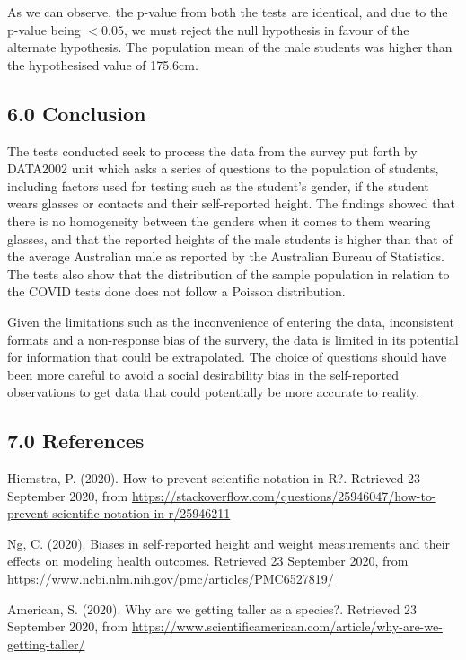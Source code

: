\documentclass[
]{article}
\begin{document}
As we can observe, the p-value from both the tests are identical, and
due to the p-value being \(<0.05\), we must reject the null hypothesis
in favour of the alternate hypothesis. The population mean of the male
students was higher than the hypothesised value of 175.6cm.

\hypertarget{conclusion}{%
\subsection{6.0 Conclusion}\label{conclusion}}

The tests conducted seek to process the data from the survey put forth
by DATA2002 unit which asks a series of questions to the population of
students, including factors used for testing such as the student's
gender, if the student wears glasses or contacts and their self-reported
height. The findings showed that there is no homogeneity between the
genders when it comes to them wearing glasses, and that the reported
heights of the male students is higher than that of the average
Australian male as reported by the Australian Bureau of Statistics. The
tests also show that the distribution of the sample population in
relation to the COVID tests done does not follow a Poisson distribution.

Given the limitations such as the inconvenience of entering the data,
inconsistent formats and a non-response bias of the survery, the data is
limited in its potential for information that could be extrapolated. The
choice of questions should have been more careful to avoid a social
desirability bias in the self-reported observations to get data that
could potentially be more accurate to reality.

\hypertarget{references}{%
\subsection{7.0 References}\label{references}}

Hiemstra, P. (2020). How to prevent scientific notation in R?. Retrieved
23 September 2020, from
\url{https://stackoverflow.com/questions/25946047/how-to-prevent-scientific-notation-in-r/25946211}

Ng, C. (2020). Biases in self-reported height and weight measurements
and their effects on modeling health outcomes. Retrieved 23 September
2020, from \url{https://www.ncbi.nlm.nih.gov/pmc/articles/PMC6527819/}

American, S. (2020). Why are we getting taller as a species?. Retrieved
23 September 2020, from
\url{https://www.scientificamerican.com/article/why-are-we-getting-taller/}
\end{document}
